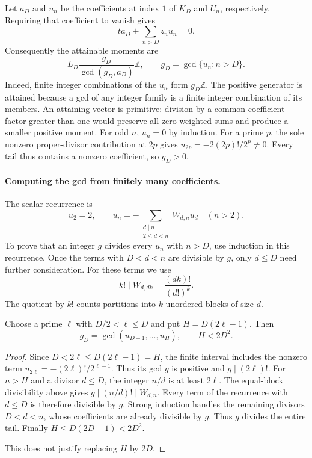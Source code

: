 \documentclass[11pt]{article}
\begin{document}
Let $a_D$ and $u_n$ be the coefficients at index $1$ of $K_D$ and $U_n$,
respectively. Requiring that coefficient to vanish gives
\begin{equation}
t a_D+\sum_{n>D}z_nu_n=0.\label{eq:support-equation}
\end{equation}
Consequently the attainable moments are
\begin{equation}
L_D\frac{g_D}{\gcd(g_D,a_D)}\mathbb Z,
\qquad g_D=\gcd\{u_n:n>D\}.
\label{eq:attainable-moment-ideal}
\end{equation}
Indeed, finite integer combinations of the $u_n$ form $g_D\mathbb Z$.
The positive generator is attained because a gcd of any integer family is
a finite integer combination of its members.  An attaining vector is
primitive: division by a common coefficient factor greater than one would
preserve all zero weighted sums and produce a smaller positive moment.  For odd $n$, $u_n=0$ by induction.  For a prime $p$, the sole nonzero
proper-divisor contribution at $2p$ gives $u_{2p}=-2(2p)!/2^p\ne0$.
Every tail thus contains a nonzero coefficient, so $g_D>0$.

\paragraph{Computing the gcd from finitely many coefficients.}
The scalar recurrence is
\[
u_2=2,\qquad
u_n=-\sum_{\substack{d\mid n\\2\le d<n}}W_{d,n}u_d\quad(n>2).
\]
To prove that an integer $g$ divides every $u_n$ with $n>D$, use induction
in this recurrence. Once the terms with $D<d<n$ are divisible by $g$, only
$d\le D$ need further consideration. For these terms we use
\[
k!\mid W_{d,dk}=\frac{(dk)!}{(d!)^k}.
\]
The quotient by $k!$ counts partitions into $k$ unordered blocks of size $d$.

\begin{theorem}
\label{res:finite-channel-moment-certificate}
Choose a prime $\ell$ with $D/2<\ell\le D$ and put $H=D(2\ell-1)$.
Then
\[
g_D=\gcd(u_{D+1},\ldots,u_H),\qquad H<2D^2.
\]
\end{theorem}

\begin{proof}
Since $D<2\ell\le D(2\ell-1)=H$, the finite interval includes the nonzero
term $u_{2\ell}=-(2\ell)!/2^{\ell-1}$.  Thus its gcd $g$ is positive and
$g\mid(2\ell)!$.
For $n>H$ and a divisor $d\le D$, the integer $n/d$ is at least $2\ell$.
The equal-block divisibility above gives $g\mid(n/d)!\mid W_{d,n}$.
Every term of the
recurrence with $d\le D$ is therefore divisible by $g$.
Strong induction handles the remaining divisors $D<d<n$, whose coefficients
are already divisible by $g$.  Thus $g$ divides the entire tail.
Finally $H\le D(2D-1)<2D^2$.

This does not justify replacing $H$ by $2D$.
\end{proof}
\end{document}
